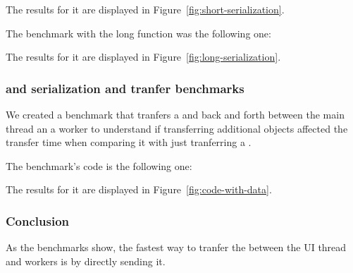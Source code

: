 The results for it are displayed in Figure~\ref{fig:short-serialization}.

The benchmark with the long function was the following one:

The results for it are displayed in Figure~\ref{fig:long-serialization}.

\subsubsection{\tstring{} and \ttarray{} serialization and tranfer benchmarks}
We created a benchmark that tranfers a \ttarray{} and \tstring{} back and forth between the main thread an a worker to understand if transferring additional objects affected the transfer time when comparing it with just tranferring a \tstring{}.

The benchmark's code is the following one:

The results for it are displayed in Figure~\ref{fig:code-with-data}.

\subsubsection{Conclusion}
As the benchmarks show, the fastest way to tranfer the \tstring{} between the UI thread and workers is by directly sending it.

\pagebreak